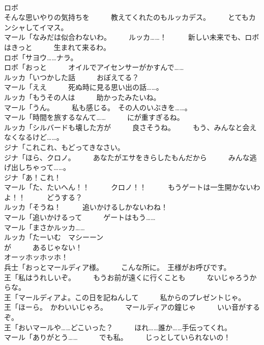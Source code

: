 \documentclass[8pt]{extreport}
\begin{document}
\begin{CJK}{UTF8}{min}
\\	ロボ
\\	そんな思いやりの気持ちを　　　教えてくれたのもルッカデス。　　　とてもカンシャしてイマス。	
\\	マール「なみだは似合わないわ。　　　ルッカ……！　　　新しい未来でも、ロボはきっと　　　生まれて来るわ。	
\\	ロボ「サヨウ……ナラ。	
\\	ロボ「おっと　　　オイルでアイセンサーがかすんで……	
\\	ルッカ「いつかした話　　　おぼえてる？	
\\	マール「ええ　　　死ぬ時に見る思い出の話……。	
\\	ルッカ「もうその人は　　　助かったみたいね。	
\\	マール「うん。　　　私も感じる。　その人のいぶきを……。	
\\	マール「時間を旅するなんて……　　　にが重すぎるね。	
\\	ルッカ「シルバードも壊した方が　　　良さそうね。　　　もう、みんなと会えなくなるけど……。	
\\	ジナ「これこれ、もどってきなさい。	
\\	ジナ「ほら、クロノ。　　　あなたがエサをきらしたもんだから　　　みんな逃げ出しちゃって……。	
\\	ジナ「あ！これ！	
\\	マール「た、たいへん！！　　　クロノ！！　　　もうゲートは一生開かないわよ！！　　　どうする？	
\\	ルッカ「そうね！　　　追いかけるしかないわね！	
\\	マール「追いかけるって　　　ゲートはもう……	
\\	マール「まさかルッカ……	
\\	ルッカ「たーいむ　マシーーン
\\	が　　　あるじゃない！	
\\	オーッホッホッホ！	
\\	兵士「おっとマールディア様。　　　こんな所に。　王様がお呼びです。	
\\	王「私はうれしいぞ。　　　もうお前が遠くに行くことも　　　ないじゃろうからな。	
\\	王「マールディアよ。この日を記ねんして　　　私からのプレゼントじゃ。	
\\	王「ほーら。　かわいいじゃろ。　　　マールディアの鐘じゃ　　　いい音がするぞ。	
\\	王「おいマールや……どこいった？　　　ほれ……誰か……手伝ってくれ。	
\\	マール「ありがとう……　　　でも私。　　　じっとしていられないの！	

\end{CJK}
\end{document}
